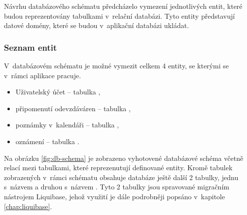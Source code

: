 Návrhu databázového schématu předcházelo vymezení jednotlivých entit, které budou reprezentovány tabulkami v~relační databázi. Tyto entity představují datové domény, které se budou v~aplikační databázi ukládat.

\subsubsection{Seznam entit}

V~databázovém schématu je možné vymezit celkem 4 entity, se kterými se v~rámci aplikace pracuje.

\begin{itemize}
    \item Uživatelský účet -- tabulka ,
    \item připomenutí odevzdáváren -- tabulka ,
    \item poznámky v~kalendáři -- tabulka ,
    \item oznámení -- tabulka .
\end{itemize}

Na obrázku \ref{fig:db-schema} je zobrazeno vyhotovené databázové schéma včetně relací mezi tabulkami, které reprezenutují definované entity. Kromě tabulek zobrazených v~rámci schématu obsahuje databáze ještě další 2 tabulky, jednu s~názvem  a druhou s~názvem . Tyto 2 tabulky jsou spravované migračním nástrojem Liquibase, jehož využití je dále podrobněji popsáno v~kapitole \ref{chap:liquibase}.

